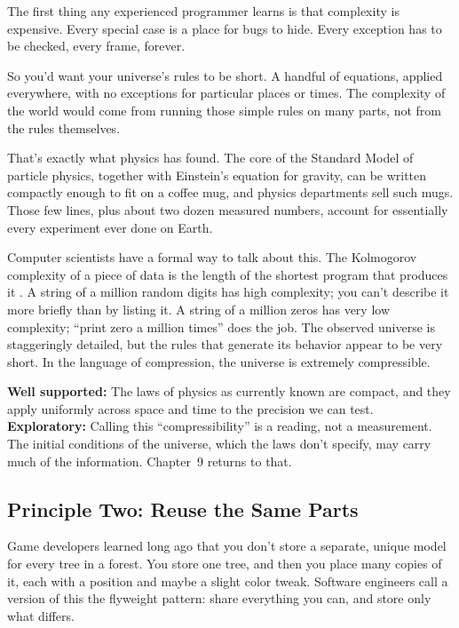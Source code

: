 The first thing any experienced programmer learns is that complexity is expensive. Every special case is a place for bugs to hide. Every exception has to be checked, every frame, forever.

So you'd want your universe's rules to be short. A handful of equations, applied everywhere, with no exceptions for particular places or times. The complexity of the world would come from running those simple rules on many parts, not from the rules themselves.

That's exactly what physics has found. The core of the Standard Model of particle physics, together with Einstein's equation for gravity, can be written compactly enough to fit on a coffee mug, and physics departments sell such mugs. Those few lines, plus about two dozen measured numbers, account for essentially every experiment ever done on Earth.

Computer scientists have a formal way to talk about this. The Kolmogorov complexity of a piece of data is the length of the shortest program that produces it \cite{livitanyi2008}. A string of a million random digits has high complexity; you can't describe it more briefly than by listing it. A string of a million zeros has very low complexity; ``print zero a million times'' does the job. The observed universe is staggeringly detailed, but the rules that generate its behavior appear to be very short. In the language of compression, the universe is extremely compressible.

\begin{researchnotebox}
\textbf{Well supported:} The laws of physics as currently known are compact, and they apply uniformly across space and time to the precision we can test. \textbf{Exploratory:} Calling this ``compressibility'' is a reading, not a measurement. The initial conditions of the universe, which the laws don't specify, may carry much of the information. Chapter~9 returns to that.
\end{researchnotebox}

\subsection{Principle Two: Reuse the Same Parts}

Game developers learned long ago that you don't store a separate, unique model for every tree in a forest. You store one tree, and then you place many copies of it, each with a position and maybe a slight color tweak. Software engineers call a version of this the flyweight pattern: share everything you can, and store only what differs.

